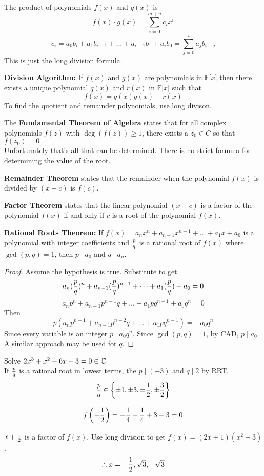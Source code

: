 \documentclass[english, 12pt]{article}
\begin{document}
\begin{mthd}
The product of polynomials $f(x)$ and $g(x)$ is
\[ f(x) \cdot g(x) = \sum_{i=0}^{m+n} c_{i} x^i\]
\[ c_{i} = a_{0} b_{i} + a_{1} b_{i-1} + \dots + a_{i-1} b_{1} + a_{i} b_{0} = \sum_{j=0}^i a_{j} b_{i-j} \]
This is just the long division formula.
\end{mthd}
\begin{thrm}
\textbf{Division Algorithm:} If $f(x)$ and $g(x)$ are polynomials in $\mathbb{F} \lbrack x \rbrack$ then there exists a unique polynomial $q(x)$ and $r(x)$ in $\mathbb{F} \lbrack x \rbrack$ such that
\[f(x) = q(x) g(x) + r(x)\]
To find the quotient and remainder polynomials, use long divison.
\end{thrm}
\begin{thrm}[FTA]
The \textbf{Fundamental Theorem of Algebra} states that for all complex polynomials $f(z)$ with $\deg(f(z)) \geq 1$, there exists a $z_{0} \in C$ so that $f(z_{0}) = 0$\\
Unfortunately that's all that can be determined. There is no strict formula for determining the value of the root.
\end{thrm}
\begin{thrm}
\textbf{Remainder Theorem} states that the remainder when the polynomial $f(x)$ is divided by $(x-c)$ is $f(c)$.
\end{thrm}
\begin{thrm}[FT]
\textbf{Factor Theorem} states that the linear polynomial $(x-c)$ is a factor of the polynomial $f(x)$ if and only if $c$ is a root of the polynomial $f(x)$.
\end{thrm}
\begin{thrm}[RRT]
\textbf{Rational Roots Theorem:} If $f(x) = a_{n}x^n + a_{n-1} x^{n-1} + \dots + a_{1} x + a_{0}$ is a polynomial with integer coefficients and $\frac{p}{q}$ is a rational root of $f(x)$ where $\gcd(p,q) = 1$, then $p \mid a_{0}$ and $q \mid a_{n}$.
\begin{proof}
Assume the hypothesis is true. Substitute to get
\[ a_{n}(\frac{p}{q})^n + a_{n-1} (\frac{p}{q})^{n-1} + \dots + a_{1} (\frac{p}{q}) + a_{0}=0\]
\[ a_{n}p^n + a_{n-1} p^{n-1}q + \dots + a_{1} p q^{n-1}+ a_{0} q^n = 0\]
Then
\[ p(a_{n} p^{n-1}+ a_{n-1} p^{n-2}q + \dots + a_{1} p q^{n-1}) =  -a_{0} q^n\]
Since every variable is an integer $p \mid a_{0}q^n$. Since $\gcd(p,q) = 1$, by CAD, $p \mid a_{0}$. A similar approach may be used for $q$.
\end{proof}
\end{thrm}
\begin{exmp}
Solve $2x^3 + x^2 - 6x - 3 = 0 \in {\mathbb{C}}$\\
If $\frac{p}{q}$ is a rational root in lowest terms, the $p \mid (-3)$ and $q \mid 2$ by RRT.
\[ \frac{p}{q} \in \left\{\pm 1, \pm 3, \pm \frac{1}{2}, \pm\frac{3}{2}\right\}\]
\begin{note}
\[f\left(-\frac{1}{2}\right) = - \frac{1}{4} + \frac{1}{4} + 3 - 3 = 0\]
\end{note}
$x +\frac{1}{2}$ is a factor of $f(x)$.
Use long division to get $f(x) = (2x + 1)(x^2 - 3)$. 
\[ \therefore x = -\frac{1}{2}, \sqrt 3, - \sqrt{3}\]
\end{exmp}
\end{document}
